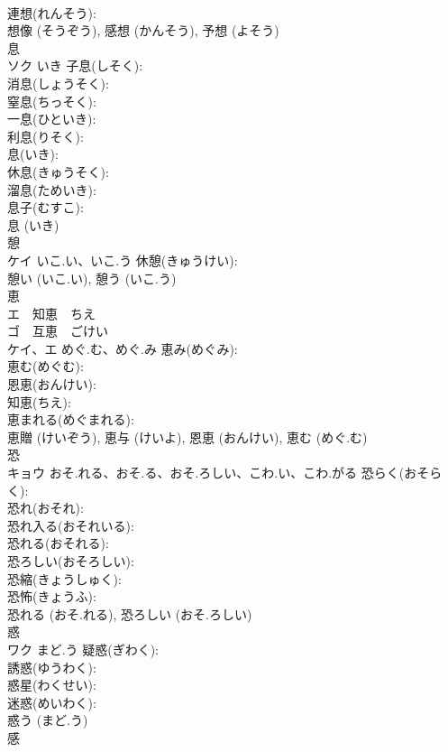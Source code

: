 \documentclass[8pt]{extreport}
\begin{document}
\begin{CJK}{UTF8}{min}
\\	連想(れんそう): 
\\	想像 (そうぞう), 感想 (かんそう), 予想 (よそう)
\\	息			
\\	ソク	いき	子息(しそく): 
\\	消息(しょうそく): 
\\	窒息(ちっそく): 
\\	一息(ひといき): 
\\	利息(りそく): 
\\	息(いき): 
\\	休息(きゅうそく): 
\\	溜息(ためいき): 
\\	息子(むすこ): 
\\	息 (いき)
\\	憩			
\\	ケイ	いこ.い、いこ.う	休憩(きゅうけい): 
\\	憩い (いこ.い), 憩う (いこ.う)
\\	恵			
\\	エ　知恵　ちえ
\\	ゴ　互恵　ごけい
\\	ケイ、エ	めぐ.む、めぐ.み	恵み(めぐみ): 
\\	恵む(めぐむ): 
\\	恩恵(おんけい): 
\\	知恵(ちえ): 
\\	恵まれる(めぐまれる): 
\\	恵贈 (けいぞう), 恵与 (けいよ), 恩恵 (おんけい), 恵む (めぐ.む)
\\	恐			
\\	キョウ	おそ.れる、おそ.る、おそ.ろしい、こわ.い、こわ.がる	恐らく(おそらく): 
\\	恐れ(おそれ): 
\\	恐れ入る(おそれいる): 
\\	恐れる(おそれる): 
\\	恐ろしい(おそろしい): 
\\	恐縮(きょうしゅく): 
\\	恐怖(きょうふ): 
\\	恐れる (おそ.れる), 恐ろしい (おそ.ろしい)
\\	惑			
\\	ワク	まど.う	疑惑(ぎわく): 
\\	誘惑(ゆうわく): 
\\	惑星(わくせい): 
\\	迷惑(めいわく): 
\\	惑う (まど.う)
\\	感			

\end{CJK}
\end{document}
